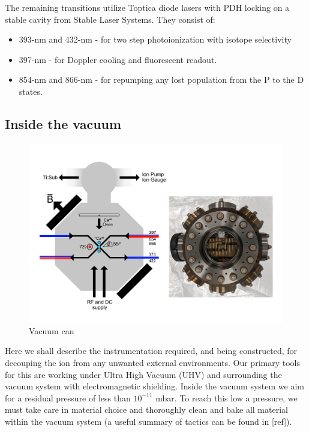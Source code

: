 \documentclass[12pt]{iopart}
\begin{document}
The remaining transitions utilize Toptica diode lasers with PDH
locking on a stable cavity from Stable Laser Systems. They consist of:
\begin{itemize}
\item 393-nm and 432-nm - for two step photoionization with isotope selectivity
\item 397-nm - for Doppler cooling and fluorescent readout.
\item 854-nm and 866-nm - for repumping any lost population from the P to the D states.
\end{itemize}


\subsection{Inside the vacuum}

\begin{figure}
  \begin{center}
   \noindent\includegraphics[width=\linewidth]{figures/vacuum_can.pdf}
  \end{center}
  \caption{Vacuum can}
  \label{fig:can}
\end{figure}

Here we shall describe the instrumentation required, and being
constructed, for decouping the ion from any unwanted external
environments. Our primary tools for this are working under Ultra High
Vacuum (UHV) and surrounding the vacuum system with electromagnetic
shielding. Inside the vacuum system we aim for a residual pressure of
less than $10^{-11}$ mbar. To reach this low a pressure, we must take
care in material choice and thoroughly clean and bake all material
within the vacuum system (a useful summary of tactics can be found in [ref]).
\end{document}
